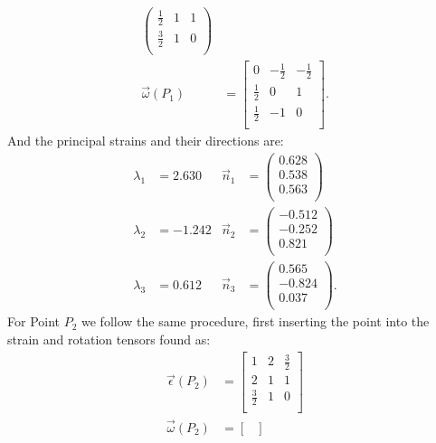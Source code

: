 \begin{derivation}
\begin{align*}
\begin{pmatrix}
      \frac{1}{2} & 1 & 1\\
      \frac{3}{2} & 1 & 0\\
      \end{pmatrix} \\
        \Vec{\omega}(P_1) &= \begin{bmatrix}
          0 & -\frac{1}{2} & -\frac{1}{2}\\
        \frac{1}{2} & 0 & 1\\
        \frac{1}{2} & -1 & 0\\
        \end{bmatrix}
    .\end{align*}
    And the principal strains and their directions are:
    \begin{align*}
      \lambda_1 &= \num{2,630} & \Vec{n}_1 &= \begin{pmatrix}
       \num{0,628} \\
      \num{0,538} \\
      \num{0,563} \\
      \end{pmatrix} \\
        \lambda_2 &= -\num{1,242} & \Vec{n}_2 &= \begin{pmatrix}
          -\num{0,512} \\
        \num{-0,252} \\
        \num{0,821} \\
        \end{pmatrix} \\
          \lambda_3 &= \num{0,612} & \Vec{n}_3 &= \begin{pmatrix}
            \num{0,565} \\
          \num{-0,824} \\
          \num{0,037} \\
          \end{pmatrix}
    .\end{align*}
    For Point $P_2$ we follow the same procedure, first inserting the point into the strain and rotation tensors found as:
    \begin{align*}
      \Vec{\epsilon}(P_2) &= \begin{bmatrix}
        1 & 2 & \frac{3}{2}\\
      2 & 1 & 1\\
      \frac{3}{2} & 1 & 0\\
      \end{bmatrix} \\
      \Vec{\omega}(P_2) &= \begin{bmatrix}

\end{bmatrix}
\end{align*}
\end{derivation}

